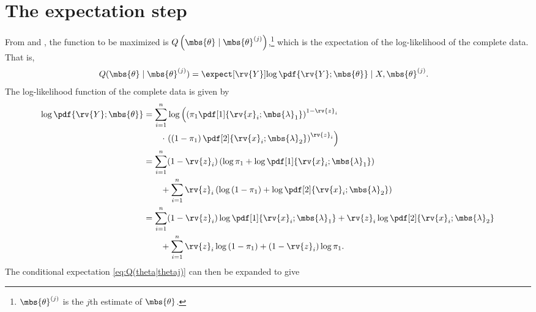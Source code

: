 \documentclass{tufte-handout}
\begin{document}
    \section{The expectation step}
    From \cite{hastie_elements_2009} and \cite{wasserman_all_2004}, the function to be maximized is $Q\left(\mbs{\theta}\mid\mbs{\theta}^{(j)}\right)$,\footnote{$\mbs{\theta}^{(j)}$ is the $j$th estimate of $\mbs{\theta}$.} which is the expectation of the log-likelihood of the complete data. That is,
    \begin{align}
        \label{eq:Q(theta|thetaj)}
        Q(\mbs{\theta}\mid\mbs{\theta}^{(j)}) &= \expect[\rv{Y}]{\log \pdf{\rv{Y} ; \mbs{\theta}} \mid X, \mbs{\theta}^{(j)}}.
    \end{align}
    The log-likelihood function of the complete data is given by
    \begin{align}
        \log \pdf{\rv{Y} ; \mbs{\theta}} 
        &=
        \sum_{i=1}^{n}
        \log \left( \left(\pi_{1}\pdf[1]{\rv{x}_{i}; \mbs{\lambda}_{1}}\right)^{1-\rv{z}_{i}} \right.\nonumber\\&\qquad\cdot\left.\left( \left(1-\pi_{1}\right)\pdf[2]{\rv{x}_{i}; \mbs{\lambda}_{2}} \right)^{\rv{z}_{i}} \right) \\
        &=
        \sum_{i=1}^{n} (1-\rv{z}_{i})\left( \log \pi_{1}+ \log \pdf[1]{\rv{x}_{i}; \mbs{\lambda}_{1}} \right)\nonumber\\&\qquad
        +\sum_{i=1}^{n}\rv{z}_{i}\left(\log\left( 1-\pi_{1} \right)  + \log\pdf[2]{\rv{x}_{i}; \mbs{\lambda}_{2}}\right)\\
        &=
        \sum_{i=1}^{n} (1-\rv{z}_{i}) \log \pdf[1]{\rv{x}_{i}; \mbs{\lambda}_{1}} + \rv{z}_{i}\log\pdf[2]{\rv{x}_{i}; \mbs{\lambda}_{2}}
        \nonumber\\&\qquad
        +\sum_{i=1}^{n}\rv{z}_{i}\log\left( 1-\pi_{1} \right) + (1-\rv{z}_{i})\log \pi_{1}.
    \end{align}
    The conditional expectation \eqref{eq:Q(theta|thetaj)} can then be expanded to give
\end{document}
